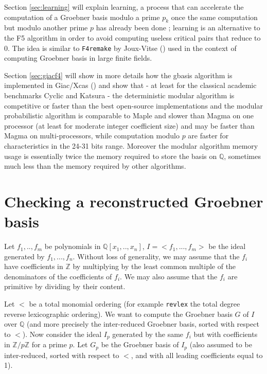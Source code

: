 \documentclass[a4paper,11pt]{book}
\begin{document}
\begin{giacjshere}
Section \ref{sec:learning}
 will explain learning, a process that can accelerate the
computation of a Groebner basis modulo a prime $p_k$ once the
same computation but modulo another prime $p$ has already been
done ; learning is an alternative to the F5 algorithm
in order to avoid computing useless critical pairs that reduce to 0. The
idea is similar to {\tt F4remake} by Joux-Vitse (\cite{joux2011variant}) 
used in the context of computing Groebner basis in large finite fields.

Section \ref{sec:giacf4} 
will show in more details how the gbasis algorithm is implemented
in Giac/Xcas (\cite{giac}) and show that - at least for the classical academic
benchmarks Cyclic and Katsura - the deterministic modular algorithm
is competitive or faster than the best open-source implementations
and the modular probabilistic algorithm is comparable to Maple
and slower than Magma on one processor (at least for moderate integer coefficient
size) and may be faster than Magma on multi-processors, 
while computation modulo $p$ are faster for characteristics in the
24-31 bits range.
Moreover the modular algorithm memory usage is essentially
twice the memory required to store the basis on $\mathbb{Q}$, sometimes
much less than the memory required by other algorithms.

\section{Checking a reconstructed Groebner basis} \label{sec:probagb}
Let $f_1,..,f_m$ be polynomials in $\mathbb{Q}[x_1,..,x_n]$, $I=<f_1,...,f_m>$
be the ideal generated by $f_1,...,f_n$. Without loss of generality, we may
assume that the $f_i$ have coefficients in $\mathbb{Z}$ by multiplying
by the least common multiple of the denominators of the coefficients
of $f_i$. We may also assume that the $f_i$ are primitive by dividing
by their content.

Let $<$ be a total monomial ordering (for example {\tt revlex} the
total degree reverse lexicographic ordering). We want to compute
the Groebner basis $G$ of $I$ over $\mathbb{Q}$ (and more precisely
the inter-reduced Groebner basis, sorted with respect to $<$).
Now consider the ideal $I_p$ generated by the same $f_i$ but with
coefficients in $\mathbb{Z}/p\mathbb{Z}$ for a prime $p$. Let $G_p$ be the Groebner basis of $I_p$
(also assumed to be inter-reduced, sorted with respect to $<$, and with
all leading coefficients equal to 1).


\end{giacjshere}
\end{document}
